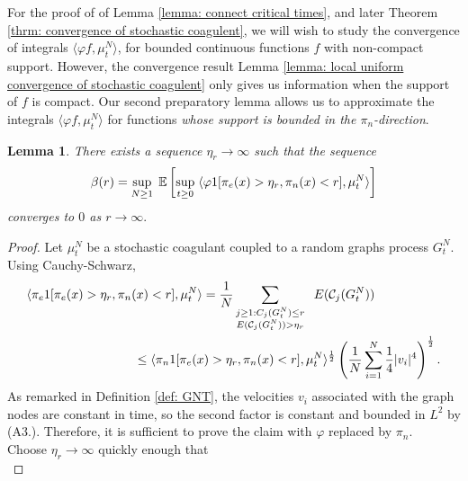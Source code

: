 \documentclass[11pt, notitlepage]{article}
\newtheorem{lem}[thm]{Lemma}
\begin{document}
For the proof of of Lemma \ref{lemma: connect critical times}, and later Theorem \ref{thrm: convergence of stochastic coagulent}, we will wish to study the convergence of integrals $\langle \varphi f, \mu^N_t\rangle$, for bounded continuous functions $f$ with non-compact support. However, the convergence result Lemma \ref{lemma: local uniform convergence of stochastic coagulent} only gives us information when the support of $f$ is compact. Our second preparatory lemma allows us to approximate the integrals $\langle \varphi f, \mu^N_t\rangle$ for functions \emph{whose support is bounded in the $\pi_n$-direction}.

\iffalse \begin{lem}\label{lemma: etar} There exists a sequence $\eta_r \rightarrow \infty$ such that the sequence \begin{equation}
    \beta(r)=\sup_{N\geq 1} \hspace{0.1cm} \mathbb{E}\left[\sup_{t\geq 0}\hspace{0.1cm}\langle \varphi 1[\pi_e(x)>\eta_r, \pi_n(x)< r], \mu^N_t\rangle \right]
\end{equation} converges to $0$ as $r \rightarrow \infty.$ \end{lem} \begin{proof} Let $\mu^N_t$ be a stochastic coagulant coupled to a random graphs process $G^N_t$. Using Cauchy-Schwarz, \begin{equation} \begin{split}
  & \langle \pi_e 1[\pi_e(x)>\eta_r, \pi_n(x)< r], \mu^N_t\rangle  = \frac{1}{N} \sum_{\substack{j\geq 1: C_j(G^N_t)\le r \\ E(\mathcal{C}_j(G^N_t))>\eta_r}} \hspace{0.2cm} E(\mathcal{C}_j(G^N_t))  %
   \\ & \hspace{3cm} \leq \langle \pi_n 1[\pi_e(x)>\eta_r, \pi_n(x)< r], \mu^N_t\rangle^\frac{1}{2}\left(\frac{1}{N}\sum_{i=1}^N \frac{1}{4}|v_i|^4\right)^\frac{1}{2}.
\end{split} \end{equation}
As remarked in Definition \ref{def: GNT}, the velocities $v_i$ associated with the graph nodes are constant in time, so the second factor is constant and bounded in $L^2$ by ({A3.}). Therefore, it is sufficient to prove the claim with $\varphi$ replaced by $\pi_n.$ \medskip \\ Choose $\eta_r\rightarrow \infty$ quickly enough that \begin{equation} \label{eq: choice of etar}

\end{equation}
\end{proof}
\end{document}
